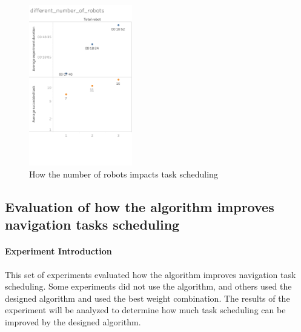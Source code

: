 \begin{figure}[htbp]
 \centering
 \includegraphics[width = 0.4\textwidth]{content/images/ch5/different_number_of_robots.png}
 \caption{How the number of robots impacts task scheduling}
 \label{fig:different_number_of_robot}
\end{figure}

\subsection{Evaluation of how the algorithm improves navigation tasks scheduling}

\paragraph{Experiment Introduction} 
This set of experiments evaluated how the algorithm improves navigation task scheduling. Some experiments did not use the algorithm, and others used the designed algorithm and used the best weight combination. The results of the experiment will be analyzed to determine how much task scheduling can be improved by the designed algorithm.


